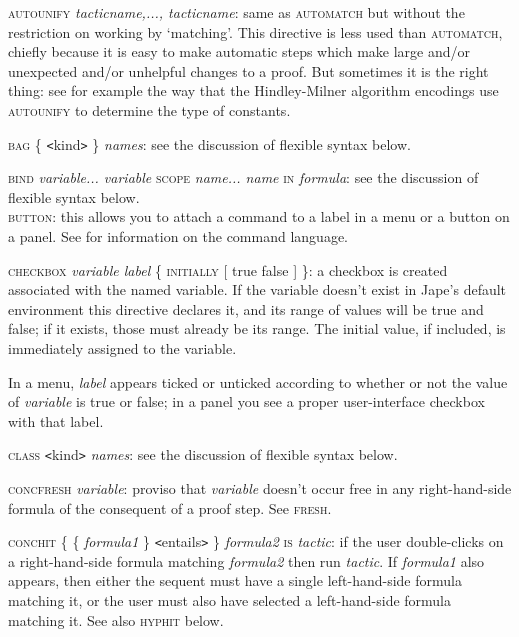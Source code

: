 \textsc{autounify} \textit{tacticname,..., tacticname}: same as \textsc{automatch} but without the restriction on working by `matching'. This directive is less used than \textsc{automatch}, chiefly because it is easy to make automatic steps which make large and/or unexpected and/or unhelpful changes to a proof. But sometimes it is the right thing: see for example the way that the Hindley-Milner algorithm encodings use \textsc{autounify} to determine the type of constants.


\textsc{bag \{} \texttt{<}kind\texttt{>} \textsc{\}} \textit{names}: see the discussion of flexible syntax below.


\textsc{bind} \textit{variable... variable} \textsc{scope} \textit{name... name} \textsc{in} \textit{formula}: see the discussion of flexible syntax below.\\
\textsc{button:} this allows you to attach a command to a label in a menu or a button on a panel. See  for information on the command language.


\textsc{checkbox} \textit{variable label} \{ \textsc{initially [} true {\textbar} false ] \}: a checkbox is created associated with the named variable. If the variable doesn't exist in Jape's default environment this directive declares it, and its range of values will be true and false; if it exists, those must already be its range. The initial value, if included, is immediately assigned to the variable.


\tab In a menu, \textit{label} appears ticked or unticked according to whether or not the value of \textit{variable} is true or false; in a panel you see a proper user-interface checkbox with that label.


\textsc{class}  \texttt{<}kind\texttt{>} \textit{names}: see the discussion of flexible syntax below.


\textsc{concfresh} \textit{variable}: proviso that \textit{variable} doesn't occur free in any right-hand-side formula of the consequent of a proof step. See \textsc{fresh}.


\textsc{conchit} \{ \{ \textit{formula1} \} \texttt{<}entails\texttt{>} \} \textit{formula2} \textsc{is} \textit{tactic}: if the user double-clicks on a right-hand-side formula matching \textit{formula2} then run \textit{tactic}. If \textit{formula1} also appears, then either the sequent must have a single left-hand-side formula matching it, or the user must also have selected a left-hand-side formula matching it. See also \textsc{hyphit} below.


